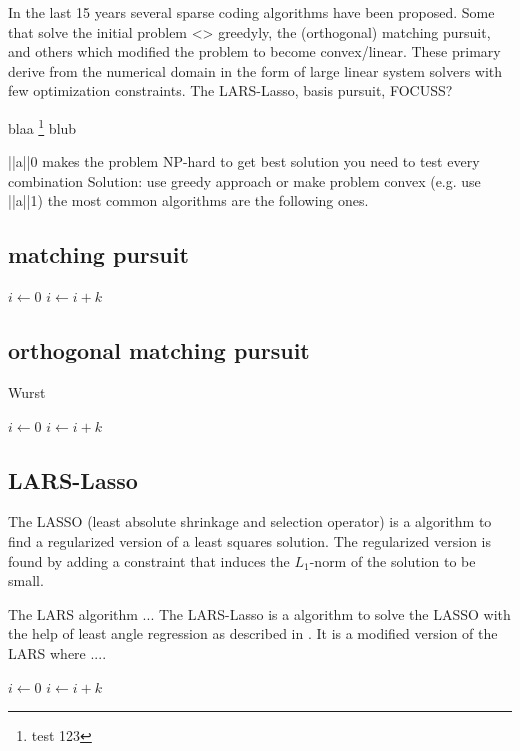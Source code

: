 In the last 15 years several sparse coding algorithms have been proposed. 
Some that solve the initial problem <> greedyly, the (orthogonal) matching pursuit, and others which modified the problem to become convex/linear. These primary derive from the numerical domain in the form of 
large linear system solvers with few optimization constraints. The LARS-Lasso, basis pursuit, FOCUSS?


blaa \footnote{test 123} blub

||a||0 makes the problem NP-hard
to get best solution you need to test every combination
Solution:
use greedy approach or make problem convex (e.g. use ||a||1)
the most common algorithms are the following ones.

\subsection{matching pursuit}
\begin{algorithmic}
        \STATE $i\gets 0$
\ELSE
                \STATE $i\gets i+k$
        \ENDIF
\ENDIF 
\end{algorithmic}

\subsection{orthogonal matching pursuit}
\label{sec:omp}
\begin{algorithm}
\caption{Wurst}
\begin{algorithmic}
        \STATE $i\gets 0$
\ELSE
                \STATE $i\gets i+k$
        \ENDIF
\ENDIF 
\end{algorithmic}

\subsection{LARS-Lasso}
The LASSO (least absolute shrinkage and selection operator) is a algorithm to find a regularized version of a least squares solution.
The regularized version is found by adding a constraint that induces the $L_1$-norm of the solution to be small.

The LARS algorithm ... \cite{least angle regression}
The LARS-Lasso is a algorithm to solve the LASSO with the help of least angle regression
as described in \cite{Least Angle Regression}. It is a modified version of the LARS where ....

\begin{algorithmic}
        \STATE $i\gets 0$
\ELSE
                \STATE $i\gets i+k$
        \ENDIF
\ENDIF 
\end{algorithmic}
\end{algorithm}


